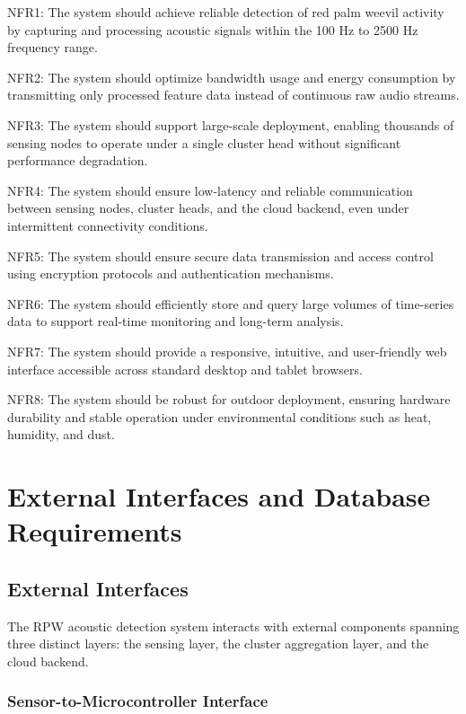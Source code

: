 \documentclass[12pt,a4paper,oneside]{memoir}
\begin{document}
NFR1: The system should achieve reliable detection of red palm weevil activity by capturing and processing acoustic signals within the 100 Hz to 2500 Hz frequency range.
 
NFR2: The system should optimize bandwidth usage and energy consumption by transmitting only processed feature data instead of continuous raw audio streams.
 
NFR3: The system should support large-scale deployment, enabling thousands of sensing nodes to operate under a single cluster head without significant performance degradation.
 
NFR4: The system should ensure low-latency and reliable communication between sensing nodes, cluster heads, and the cloud backend, even under intermittent connectivity conditions.
 
NFR5: The system should ensure secure data transmission and access control using encryption protocols and authentication mechanisms.
 
NFR6: The system should efficiently store and query large volumes of time-series data to support real-time monitoring and long-term analysis.
 
NFR7: The system should provide a responsive, intuitive, and user-friendly web interface accessible across standard desktop and tablet browsers.
 
NFR8: The system should be robust for outdoor deployment, ensuring hardware durability and stable operation under environmental conditions such as heat, humidity, and dust.
 
\section{External Interfaces and Database Requirements}
 
\subsection*{External Interfaces}
 
The RPW acoustic detection system interacts with external components spanning three distinct layers: the sensing layer, the cluster aggregation layer, and the cloud backend.
 
\subsubsection*{Sensor-to-Microcontroller Interface}
 
\end{document}
